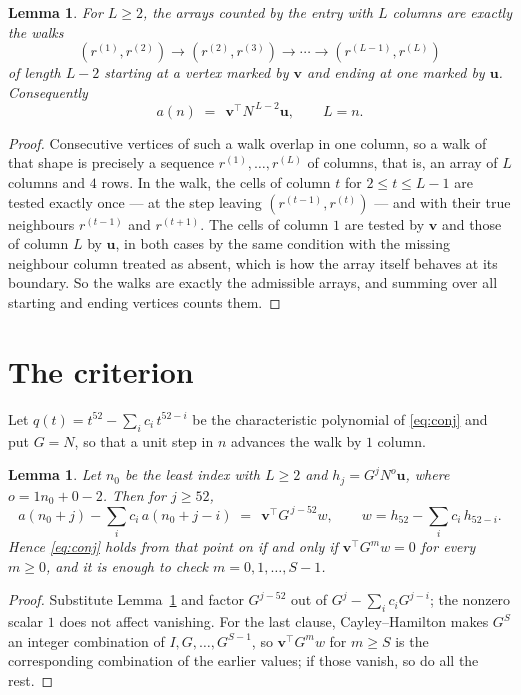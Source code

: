 \documentclass[11pt,a4paper]{article}
\theoremstyle{plain}
\newtheorem{lemma}[theorem]{Lemma}
\theoremstyle{definition}
\begin{document}
\begin{lemma}\label{lem:walk}
For $L\ge2$, the arrays counted by the entry with $L$ columns are exactly the walks
\[
(r^{(1)},r^{(2)})\to(r^{(2)},r^{(3)})\to\cdots\to(r^{(L-1)},r^{(L)})
\]
of length $L-2$ starting at a vertex marked by $\mathbf{v}$ and ending at one marked by
$\mathbf{u}$. Consequently
\[
a(n)\;=\;\,\mathbf{v}^{\!\top}N^{\,L-2}\mathbf{u},\qquad L=n .
\]
\end{lemma}

\begin{proof}
Consecutive vertices of such a walk overlap in one column, so a walk of that shape is
precisely a sequence $r^{(1)},\dots,r^{(L)}$ of columns, that is, an array of $L$ columns
and $4$ rows. In the walk, the cells of column $t$ for $2\le t\le L-1$ are tested
exactly once --- at the step leaving $(r^{(t-1)},r^{(t)})$ --- and with their true
neighbours $r^{(t-1)}$ and $r^{(t+1)}$. The cells of column $1$ are tested by
$\mathbf{v}$ and those of column $L$ by $\mathbf{u}$, in both cases by the same condition
with the missing neighbour column treated as absent, which is how the array itself behaves at
its boundary. So the walks are exactly the admissible arrays, and summing over all starting
and ending vertices counts them.
\end{proof}

\section{The criterion}

Let $q(t)=t^{52}-\sum_i c_i\,t^{52-i}$ be the characteristic polynomial of
\eqref{eq:conj} and put $G=N$, so that a unit step in $n$ advances the walk by
$1$ column.

\begin{lemma}\label{lem:crit}
Let $n_0$ be the least index with $L\ge2$ and $h_j=G^{j}N^{o}\mathbf{u}$, where
$o=1n_0+0-2$. Then for $j\ge52$,
\[
a(n_0+j)-\sum_i c_i\,a(n_0+j-i)\;=\;\,\mathbf{v}^{\!\top}G^{\,j-52}w,
\qquad w=h_{52}-\sum_i c_i\,h_{52-i} .
\]
Hence \eqref{eq:conj} holds from that point on if and only if
$\mathbf{v}^{\!\top}G^{m}w=0$ for every $m\ge0$, and it is enough to check
$m=0,1,\dots,S-1$.
\end{lemma}

\begin{proof}
Substitute Lemma~\ref{lem:walk} and factor $G^{j-52}$ out of
$G^{j}-\sum_ic_iG^{j-i}$; the nonzero scalar $1$ does not affect
vanishing. For the last clause, Cayley--Hamilton makes $G^{S}$ an integer combination of
$I,G,\dots,G^{S-1}$, so $\mathbf{v}^{\!\top}G^{m}w$ for $m\ge S$ is the corresponding
combination of the earlier values; if those vanish, so do all the rest.
\end{proof}
\end{document}
